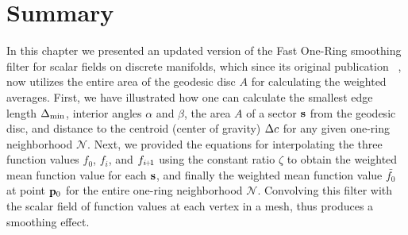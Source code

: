 \section{Summary}
In this chapter we presented an updated version of the Fast One-Ring smoothing filter for scalar fields on discrete manifolds, which since its original publication ~\cite[s.~3.2]{Mara17}, now utilizes the entire area of the geodesic disc $A$ for calculating the weighted averages. First, we have illustrated how one can calculate the smallest edge length $\Delta_\text{min}$, interior angles $\alpha$ and $\beta$, the area $A$ of a sector $\mathbf{s}$ from the geodesic disc, and distance to the centroid (center of gravity) $\Delta c$ for any given one-ring neighborhood $\mathcal{N}$. Next, we provided the equations for interpolating the three function values $f_0$, $f_i$, and $f_{\sipo}$ using the constant ratio $\zeta$ to obtain the weighted mean function value for each $\mathbf{s}$, and finally the weighted mean function value $\bar{f_0}$ at point ${\mathbf{p}_0}$ for the entire one-ring neighborhood $\mathcal{N}$. Convolving this filter with the scalar field of function values at each vertex in a mesh, thus produces a smoothing effect. 






